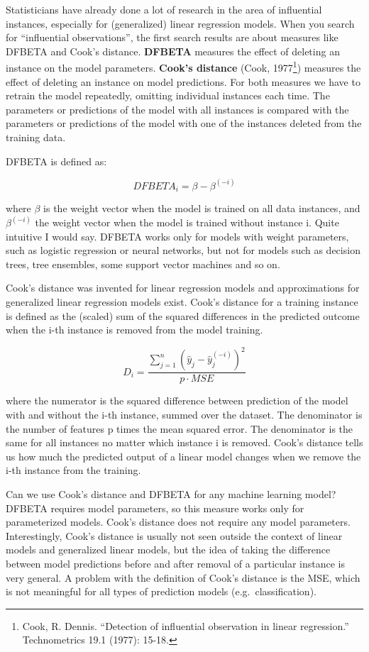\documentclass[12pt,]{krantz}
\begin{document}
Statisticians have already done a lot of research in the area of
influential instances, especially for (generalized) linear regression
models. When you search for ``influential observations'', the first
search results are about measures like DFBETA and Cook's distance.
\textbf{DFBETA} measures the effect of deleting an instance on the model
parameters. \textbf{Cook's distance} (Cook, 1977\footnote{Cook, R.
  Dennis. ``Detection of influential observation in linear regression.''
  Technometrics 19.1 (1977): 15-18.}) measures the effect of deleting an
instance on model predictions. For both measures we have to retrain the
model repeatedly, omitting individual instances each time. The
parameters or predictions of the model with all instances is compared
with the parameters or predictions of the model with one of the
instances deleted from the training data.

DFBETA is defined as:

\[DFBETA_{i}=\beta-\beta^{(-i)}\]

where \(\beta\) is the weight vector when the model is trained on all
data instances, and \(\beta^{(-i)}\) the weight vector when the model is
trained without instance i. Quite intuitive I would say. DFBETA works
only for models with weight parameters, such as logistic regression or
neural networks, but not for models such as decision trees, tree
ensembles, some support vector machines and so on.

Cook's distance was invented for linear regression models and
approximations for generalized linear regression models exist. Cook's
distance for a training instance is defined as the (scaled) sum of the
squared differences in the predicted outcome when the i-th instance is
removed from the model training.

\[D_i=\frac{\sum_{j=1}^n(\hat{y}_j-\hat{y}_{j}^{(-i)})^2}{p\cdot{}MSE}\]

where the numerator is the squared difference between prediction of the
model with and without the i-th instance, summed over the dataset. The
denominator is the number of features p times the mean squared error.
The denominator is the same for all instances no matter which instance i
is removed. Cook's distance tells us how much the predicted output of a
linear model changes when we remove the i-th instance from the training.

Can we use Cook's distance and DFBETA for any machine learning model?
DFBETA requires model parameters, so this measure works only for
parameterized models. Cook's distance does not require any model
parameters. Interestingly, Cook's distance is usually not seen outside
the context of linear models and generalized linear models, but the idea
of taking the difference between model predictions before and after
removal of a particular instance is very general. A problem with the
definition of Cook's distance is the MSE, which is not meaningful for
all types of prediction models (e.g.~classification).
\end{document}
